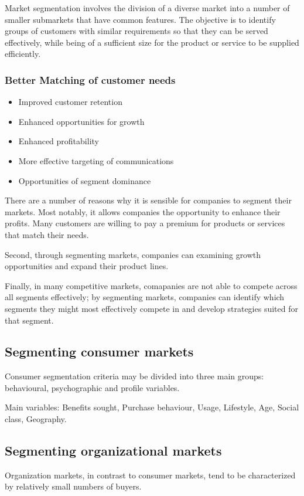 \documentclass{article}
\begin{document}
Market segmentation involves the division of a diverse market into a number of smaller submarkets that have common features. The objective is to identify groups of customers with similar requirements so that they can be served effectively, while being of a sufficient size for the product or service to be supplied efficiently. 

\subsubsection*{Better Matching of customer needs}
\begin{itemize}
    \item Improved customer retention
    \item Enhanced opportunities for growth
    \item Enhanced profitability
    \item More effective targeting of communications
    \item Opportunities of segment dominance
\end{itemize}

There are a number of reasons why it is sensible for companies to segment their markets. Most notably, it allows companies the opportunity to enhance their profits. Many customers are willing to pay a premium for products or services that match their needs.

Second, through segmenting markets, companies can examining growth opportunities and expand their product lines. 

Finally, in many competitive markets, comapanies are not able to compete across all segments effectively; by segmenting markets, companies can identify which segments they might most effectively compete in and develop strategies suited for that segment.

\subsection{Segmenting consumer markets}
Consumer segmentation criteria may be divided into three main groups: behavioural, psychographic and profile variables. 

Main variables: Benefits sought, Purchase behaviour, Usage, Lifestyle, Age, Social class, Geography.

\subsection{Segmenting organizational markets}
Organization markets, in contrast to consumer markets, tend to be characterized by relatively small numbers of buyers.
\end{document}
